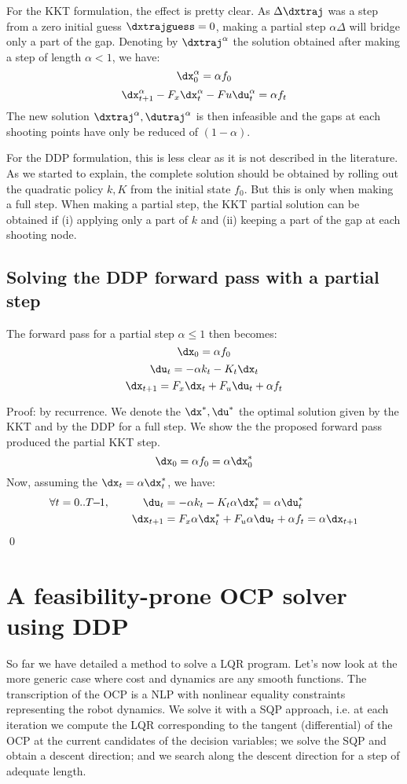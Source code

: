 \documentclass[10pt,a4paper]{article}
\begin{document}
For the KKT formulation, the effect is pretty clear. As $\Delta \dxtraj$ was a step from a zero initial guess $\dxtrajguess = 0$, making a partial step $\alpha \Delta$ will bridge only a part of the gap. Denoting by $\dxtraj^\alpha$ the solution obtained after making a step of length $\alpha<1$, we have:
$$\dx_0^\alpha = \alpha f_0$$
$$\dx_{t+1}^\alpha - F_x \dx_t^\alpha - Fu \du_t^\alpha = \alpha f_t$$
The new solution  $\dxtraj^\alpha,\dutraj^\alpha$ is then infeasible and the gaps at each shooting points have only be reduced of $(1-\alpha)$.

For the DDP formulation, this is less clear as it is not described in the literature.
As we started to explain, the complete solution should be obtained by rolling out the quadratic policy $k,K$ from the initial state $f_0$.
But this is only when making a full step.
When making a partial step, the KKT partial solution can be obtained if (i) applying only a part of $k$ and (ii) keeping a part of the gap at each shooting node.

\subsection{Solving the DDP forward pass with a partial step}

The forward pass for a partial step $\alpha \le 1$ then becomes:
$$\dx_0 = \alpha f_0$$
$$\du_t = -\alpha k_t - K_t \dx_t$$
$$\dx_{t+1} = F_x \dx_t + F_u \du_t + \alpha f_t$$

Proof: by recurrence. We denote the $\dx^*,\du^*$ the optimal solution given by the KKT and by the DDP for a full step. We show the the proposed forward pass produced the partial KKT step.
$$\dx_0 = \alpha f_0 = \alpha \dx_0^*$$
Now, assuming the $\dx_t = \alpha \dx_t^*$, we have:
\begin{align*}
  \forall t=0..T\!\!-\!\!1,\quad\quad\quad \du_t &= -\alpha k_t - K_t \alpha \dx_t^* = \alpha \du_t^*\\
 \dx_{t+1} &= F_x \alpha  \dx_t^* + F_u \alpha \du_t + \alpha f_t = \alpha \dx_{t+1}
\end{align*}
\qed


\section{A feasibility-prone OCP solver using DDP}

So far we have detailed a method to solve a LQR program. Let's now look at the more generic case where cost and dynamics are any smooth functions.
The transcription of the OCP is a NLP with nonlinear equality constraints representing the robot dynamics.
We solve it with a SQP approach, i.e. at each iteration we compute the LQR corresponding to the tangent (differential) of the OCP at the current candidates of the decision variables; we solve the SQP and obtain a descent direction; and we search along the descent direction for a step of adequate length.
\end{document}
